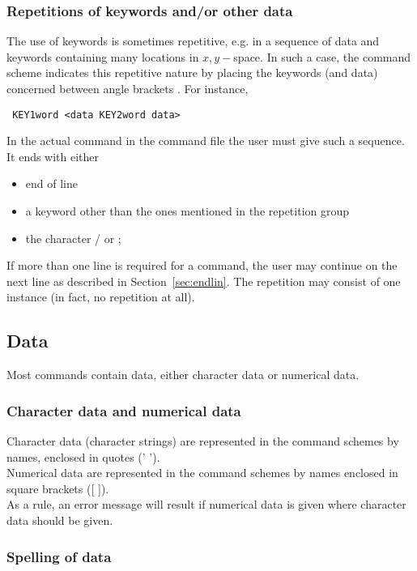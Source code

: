 \documentclass[12pt]{book}
\begin{document}
\subsubsection{Repetitions of keywords and/or other data}

The use of keywords is sometimes repetitive, e.g. in a sequence of data and keywords containing many locations in $x,y-$space.
In such a case, the command scheme indicates this repetitive nature by placing the keywords (and data) concerned between
angle brackets {\tt < >}. For instance,
\begin{verbatim}
 KEY1word <data KEY2word data>
\end{verbatim}
In the actual command in the command file the user must give such a sequence. It ends with either
\begin{itemize}
  \item end of line
  \item a keyword other than the ones mentioned in the repetition group
  \item the character / or ;
\end{itemize}
If more than one line is required for a command, the user may continue on the next line as described in Section~\ref{sec:endlin}.
The repetition may consist of one instance (in fact, no repetition at all).

\subsection{Data}

Most commands contain data, either character data or numerical data.

\subsubsection{Character data and numerical data}

Character data (character strings) are represented in the command schemes by names, enclosed in quotes ('    ').
\\[2ex]
\noindent
Numerical data are represented in the command schemes by names enclosed in square brackets ([    ]).
\\[2ex]
\noindent
As a rule, an error message will result if numerical data is given where character data should be given.

\subsubsection{Spelling of data}
\end{document}
